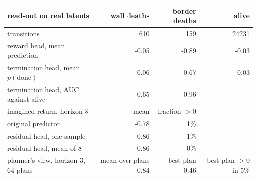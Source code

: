 \begin{tabular}{lrrr}
\toprule
read-out on real latents & wall deaths & border deaths & alive \\
\midrule
transitions & 610 & 159 & 24231 \\
reward head, mean prediction & -0.05 & -0.89 & -0.03 \\
termination head, mean $p(\text{done})$ & 0.06 & 0.67 & 0.03 \\
termination head, AUC against alive & 0.65 & 0.96 & \\
\midrule
imagined return, horizon 8 & mean & fraction $>0$ & \\
original predictor & -0.78 & 1\% & \\
residual head, one sample & -0.86 & 1\% & \\
residual head, mean of 8 & -0.86 & 0\% & \\
\midrule
planner's view, horizon 3, 64 plans & mean over plans -0.84 & best plan -0.46 & best plan $>0$ in 5\% \\
\bottomrule
\end{tabular}
